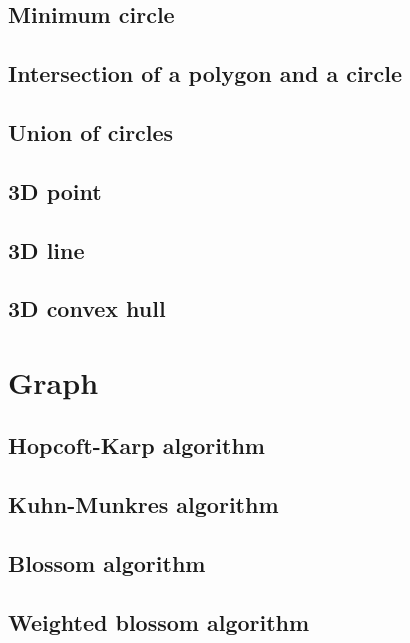 \documentclass[titlepage, a4paper,10pt]{article}
\begin{document}
\begin{multicols}{2}
\begin{spacing}{0.6}
{			\subsection{Minimum circle}
				
			\subsection{Intersection of a polygon and a circle}
				
			\subsection{Union of circles}
				
			\subsection{3D point}
				
			\subsection{3D line}
				
			\subsection{3D convex hull}
				
		\section{Graph}
			\subsection{Hopcoft-Karp algorithm}
				
			\subsection{Kuhn-Munkres algorithm}
				
			\subsection{Blossom algorithm}
				
			\subsection{Weighted blossom algorithm}
				
}
\end{spacing}
\end{multicols}
\end{document}
